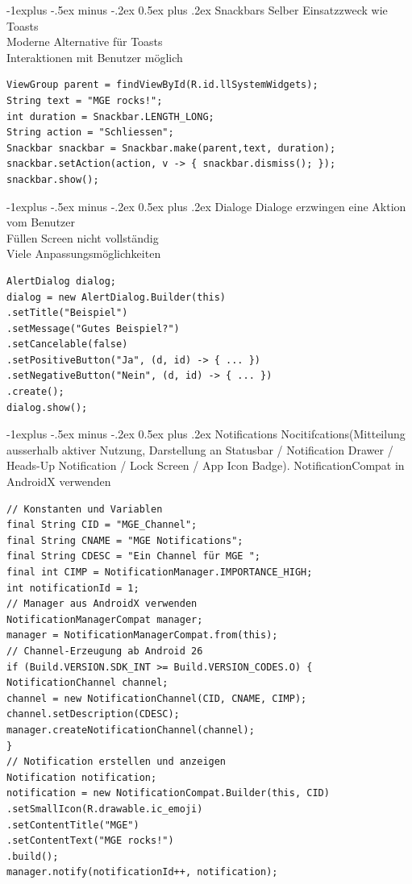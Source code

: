 \documentclass[10pt,landscape,a4paper]{article}
\makeatletter
\renewcommand{\subsection}{\@startsection{subsection}{2}{0mm}%
                                {-1explus -.5ex minus -.2ex}%
                                {0.5ex plus .2ex}%
                                {\normalfont\small\bfseries}}
\makeatother
\begin{document}
\begin{multicols*}{3}
\subsection{Snackbars}
Selber Einsatzzweck wie Toasts\\
Moderne Alternative für Toasts\\
Interaktionen mit Benutzer möglich
\begin{verbatim}
ViewGroup parent = findViewById(R.id.llSystemWidgets);
String text = "MGE rocks!";
int duration = Snackbar.LENGTH_LONG;
String action = "Schliessen";
Snackbar snackbar = Snackbar.make(parent,text, duration);
snackbar.setAction(action, v -> { snackbar.dismiss(); });
snackbar.show();
\end{verbatim}
\subsection{Dialoge}
Dialoge erzwingen eine Aktion vom Benutzer\\
Füllen Screen nicht vollständig\\
Viele Anpassungsmöglichkeiten
\begin{verbatim}
AlertDialog dialog;
dialog = new AlertDialog.Builder(this)
.setTitle("Beispiel")
.setMessage("Gutes Beispiel?")
.setCancelable(false)
.setPositiveButton("Ja", (d, id) -> { ... })
.setNegativeButton("Nein", (d, id) -> { ... })
.create();
dialog.show();
\end{verbatim}
\subsection{Notifications}
Nocitifcations(Mitteilung ausserhalb aktiver Nutzung, Darstellung an Statusbar / Notification Drawer / Heads-Up Notification / Lock Screen / App Icon Badge). NotificationCompat in AndroidX verwenden
\begin{verbatim}
// Konstanten und Variablen
final String CID = "MGE_Channel";
final String CNAME = "MGE Notifications";
final String CDESC = "Ein Channel für MGE ";
final int CIMP = NotificationManager.IMPORTANCE_HIGH;
int notificationId = 1;
// Manager aus AndroidX verwenden
NotificationManagerCompat manager;
manager = NotificationManagerCompat.from(this);
// Channel-Erzeugung ab Android 26
if (Build.VERSION.SDK_INT >= Build.VERSION_CODES.O) {
NotificationChannel channel;
channel = new NotificationChannel(CID, CNAME, CIMP);
channel.setDescription(CDESC);
manager.createNotificationChannel(channel);
}
// Notification erstellen und anzeigen
Notification notification;
notification = new NotificationCompat.Builder(this, CID)
.setSmallIcon(R.drawable.ic_emoji)
.setContentTitle("MGE")
.setContentText("MGE rocks!")
.build();
manager.notify(notificationId++, notification);
\end{verbatim}

\end{multicols*}
\end{document}
